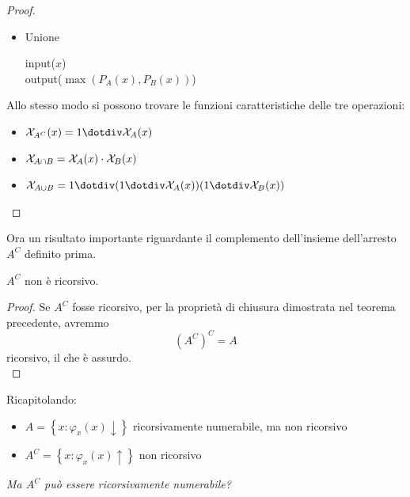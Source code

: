 \begin{proof}
\begin{itemize}
	\item Unione		
	\begin{center}
		\begin{minipage}{.5\textwidth}
			\begin{tcolorbox}[
				colback=white,
				sharp corners,
				boxrule=.3mm,
				left=20pt,
				top=0pt,
				bottom=0pt,
				colbacktitle=white,
				coltitle=black
				]
				\begin{algorithm}[H]
					\SetAlgoNoEnd
					input($x$) \\
					output($\max (P_A (x), P_B (x))$)
				\end{algorithm}
			\end{tcolorbox}
		\end{minipage}
	\end{center}
	\end{itemize}
	
	Allo stesso modo si possono trovare le funzioni caratteristiche delle tre operazioni: 
	\begin{itemize}
		\item $\X_{A^C} (x) = 1 \dotminus \X_A (x)$
		\item $\mathcal{X}_{A \cap B} = \mathcal{X}_A (x) \cdot \mathcal{X}_B (x)$
		\item $\X_{A \cup B} = 1 \dotminus (1 \dotminus \X_A (x)) (1 \dotminus \X_B (x))$
	\end{itemize}
\end{proof}

Ora un risultato importante riguardante il complemento dell'insieme dell'arresto $A^C$ definito prima.\\

\begin{theor}
	$A^C$ non è ricorsivo.
\end{theor}
\begin{proof}
	Se $A^C$ fosse ricorsivo, per la proprietà di chiusura dimostrata nel teorema precedente, avremmo
	$$ \left(A^C\right)^C = A $$
	ricorsivo, il che è assurdo.\\
\end{proof}

Ricapitolando:
\begin{itemize}
	\item $A = \left\{x: \varphi_x (x) \downarrow\right\}$ ricorsivamente numerabile, ma non ricorsivo
	\item $A^C = \left\{x: \varphi_x (x) \uparrow\right\}$ non ricorsivo 
\end{itemize}
\textit{Ma $A^C$ può essere ricorsivamente numerabile?}

